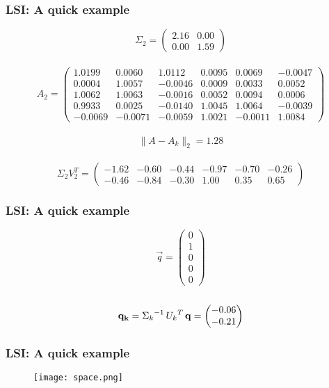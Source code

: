 \begin{frame}[plain]
\frametitle{LSI: A quick example}
\begin{equation}
 \Sigma_{2} =
\begin{pmatrix}
 2.16 & 0.00 \\
 0.00 & 1.59 \end{pmatrix}
\end{equation}
\\
\begin{equation}
A_{2} = \begin{pmatrix}
    1.0199 &   0.0060 &   1.0112 &   0.0095 &   0.0069 &  -0.0047 \\
    0.0004 &   1.0057 &  -0.0046 &   0.0009 &   0.0033 &   0.0052 \\
    1.0062 &   1.0063 &  -0.0016 &   0.0052 &   0.0094 &   0.0006 \\
    0.9933 &   0.0025 &  -0.0140 &   1.0045 &   1.0064 &  -0.0039 \\
   -0.0069 &  -0.0071 &  -0.0059 &   1.0021 &  -0.0011 &   1.0084 \end{pmatrix}
\end{equation}
\\
\begin{equation}
\|A - A_{k}\|_{2} = 1.28
\end{equation}
\\
\begin{equation}
\Sigma_{2} V_{2}^{T} = \begin{pmatrix}
 -1.62 & -0.60 & -0.44 & -0.97 & -0.70 & -0.26\\
 -0.46 & -0.84 & -0.30 &  1.00 &  0.35 &  0.65 \end{pmatrix} 
\end{equation}
\end{frame}
\begin{frame}[plain]
\frametitle{LSI: A quick example}
\begin{equation}
\vec{q} = \begin{pmatrix}0\\1\\0\\0\\0\end{pmatrix}
\end{equation}\
\\
\begin{equation}
\mathbf{q_{k}} = {\Sigma_k}^{-1} \,{U_k}^{T}\,\mathbf{q} = \begin{pmatrix}-0.06\\-0.21\end{pmatrix}
\end{equation}
\end{frame}
\begin{frame}[plain]
\frametitle{LSI: A quick example}
\begin{center}
  \begin{figure}[H]
    \centering
    \texttt{[image: space.png]}
    \label{fig:spaces}
  \end{figure}
\end{center}
\end{frame}

